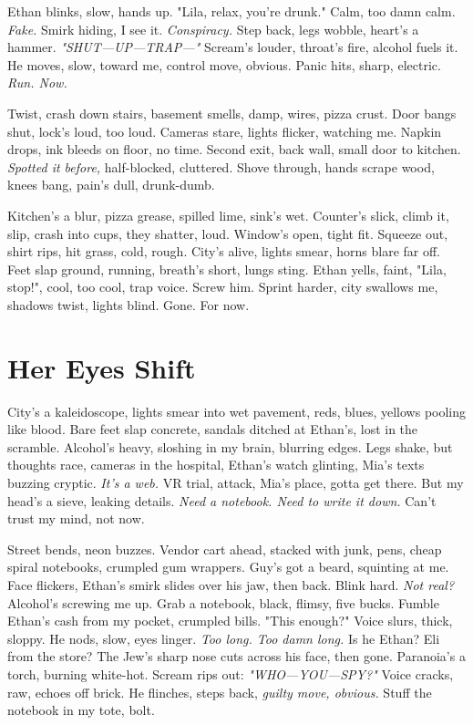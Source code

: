 \documentclass[12pt]{article}
\begin{document}
\textnormal{Ethan} blinks, slow, hands up. "Lila, relax, you’re drunk." Calm, too damn calm. \textit{Fake.} Smirk hiding, I see it. \textit{Conspiracy.} Step back, legs wobble, heart’s a hammer. \textit{"SHUT—UP—TRAP—"} Scream’s louder, throat’s fire, alcohol fuels it. He moves, slow, toward me, control move, obvious. Panic hits, sharp, electric. \textit{Run. Now.}

Twist, crash down stairs, basement smells, damp, wires, pizza crust. Door bangs shut, lock’s loud, too loud. Cameras stare, lights flicker, watching me. Napkin drops, ink bleeds on floor, no time. Second exit, back wall, small door to kitchen. \textit{Spotted it before,} half-blocked, cluttered. Shove through, hands scrape wood, knees bang, pain’s dull, drunk-dumb.

Kitchen’s a blur, pizza grease, spilled lime, sink’s wet. Counter’s slick, climb it, slip, crash into cups, they shatter, loud. Window’s open, tight fit. Squeeze out, shirt rips, hit grass, cold, rough. City’s alive, lights smear, horns blare far off. Feet slap ground, running, breath’s short, lungs sting. \textnormal{Ethan} yells, faint, "Lila, stop!", cool, too cool, trap voice. Screw him. Sprint harder, city swallows me, shadows twist, lights blind. Gone. For now.

\section{Her Eyes Shift}

City’s a kaleidoscope, lights smear into wet pavement, reds, blues, yellows pooling like blood. Bare feet slap concrete, sandals ditched at \textnormal{Ethan}’s, lost in the scramble. Alcohol’s heavy, sloshing in my brain, blurring edges. Legs shake, but thoughts race, cameras in the hospital, \textnormal{Ethan}’s watch glinting, \textnormal{Mia}’s texts buzzing cryptic. \textit{It’s a web.} VR trial, attack, \textnormal{Mia}’s place, gotta get there. But my head’s a sieve, leaking details. \textit{Need a notebook. Need to write it down.} Can’t trust my mind, not now.

Street bends, neon buzzes. Vendor cart ahead, stacked with junk, pens, cheap spiral notebooks, crumpled gum wrappers. Guy’s got a beard, squinting at me. Face flickers, \textnormal{Ethan}’s smirk slides over his jaw, then back. Blink hard. \textit{Not real?} Alcohol’s screwing me up. Grab a notebook, black, flimsy, five bucks. Fumble \textnormal{Ethan}’s cash from my pocket, crumpled bills. "This enough?" Voice slurs, thick, sloppy. He nods, slow, eyes linger. \textit{Too long. Too damn long.} Is he \textnormal{Ethan}? \textnormal{Eli} from the store? The Jew’s sharp nose cuts across his face, then gone. Paranoia’s a torch, burning white-hot. Scream rips out: \textit{"WHO—YOU—SPY?"} Voice cracks, raw, echoes off brick. He flinches, steps back, \textit{guilty move, obvious.} Stuff the notebook in my tote, bolt.
\end{document}
